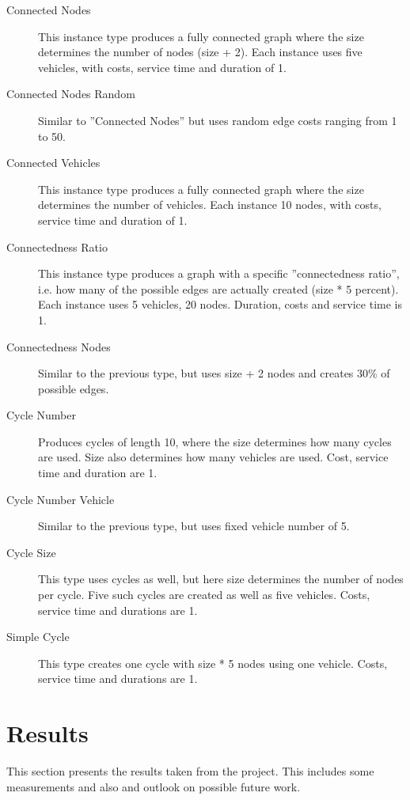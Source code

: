 \documentclass[12pt, letterpaper]{article}
\begin{document}
\begin{description}

\item[Connected Nodes]
This instance type produces a fully connected graph where the size determines the number of nodes (size + 2). Each instance uses five vehicles, with costs, service time and duration of 1.

\item[Connected Nodes Random]
Similar to ''Connected Nodes'' but uses random edge costs ranging from 1 to 50.

\item[Connected Vehicles]
This instance type produces a fully connected graph where the size determines the number of vehicles. Each instance 10 nodes, with costs, service time and duration of 1.

\item[Connectedness Ratio]
This instance type produces a graph with a specific ''connectedness ratio'', i.e. how many of the possible edges are actually created (size * 5 percent). Each instance uses 5 vehicles, 20 nodes. Duration, costs and service time is 1.

\item[Connectedness Nodes]
Similar to the previous type, but uses size + 2 nodes and creates 30\% of possible edges.

\item[Cycle Number]
Produces cycles of length 10, where the size determines how many cycles are used. Size also determines how many vehicles are used. Cost, service time and duration are 1.

\item[Cycle Number Vehicle]
Similar to the previous type, but uses fixed vehicle number of 5.

\item[Cycle Size]
This type uses cycles as well, but here size determines the number of nodes per cycle. Five such cycles are created as well as five vehicles. Costs, service time and durations are 1.

\item[Simple Cycle]
This type creates one cycle with size * 5 nodes using one vehicle. Costs, service time and durations are 1.

\end{description}


\section{Results}
This section presents the results taken from the project. This includes some measurements and also and outlook on possible future work.
\end{document}
